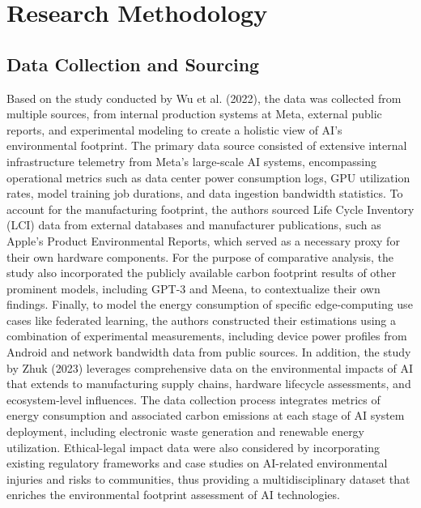 \documentclass[a4paper, 12pt]{article}
\begin{document}
\section{Research Methodology}
\subsection{Data Collection and Sourcing}
\hspace{24pt}Based on the study conducted by Wu et al. (2022), the data was collected from multiple sources, from internal production systems at Meta, external public reports, and experimental modeling to create a holistic view of AI's environmental footprint. The primary data source consisted of extensive internal infrastructure telemetry from Meta's large-scale AI systems, encompassing operational metrics such as data center power consumption logs, GPU utilization rates, model training job durations, and data ingestion bandwidth statistics. To account for the manufacturing footprint, the authors sourced Life Cycle Inventory (LCI) data from external databases and manufacturer publications, such as Apple's Product Environmental Reports, which served as a necessary proxy for their own hardware components. For the purpose of comparative analysis, the study also incorporated the publicly available carbon footprint results of other prominent models, including GPT-3 and Meena, to contextualize their own findings. Finally, to model the energy consumption of specific edge-computing use cases like federated learning, the authors constructed their estimations using a combination of experimental measurements, including device power profiles from Android and network bandwidth data from public sources.
In addition, the study by Zhuk (2023) leverages comprehensive data on the environmental impacts of AI that extends to manufacturing supply chains, hardware lifecycle assessments, and ecosystem-level influences. The data collection process integrates metrics of energy consumption and associated carbon emissions at each stage of AI system deployment, including electronic waste generation and renewable energy utilization. Ethical-legal impact data were also considered by incorporating existing regulatory frameworks and case studies on AI-related environmental injuries and risks to communities, thus providing a multidisciplinary dataset that enriches the environmental footprint assessment of AI technologies.
\end{document}
